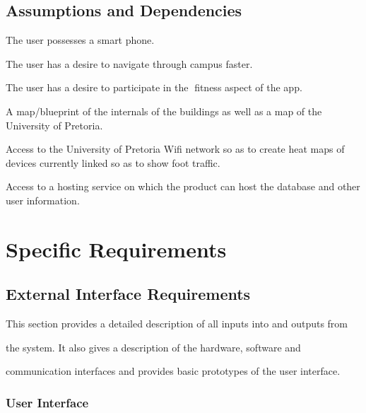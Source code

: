 \documentclass[12pt]{article}
\begin{document}
\subsection{Assumptions and Dependencies}
\begin{list}{Assumption:}{}
	\item The user possesses a smart phone.
	\item The user has a desire to navigate through campus faster.
	\item The user has a desire to participate in the fitness aspect of the
app.
\end{list}

\begin{list}{Dependency:}{}
	\item A map/blueprint of the internals of the buildings as well as a
map of the University of Pretoria.
	\item Access to the University of Pretoria Wifi network so as to create
heat maps of devices currently linked so as to show foot traffic.
	\item Access to a hosting service on which the product can host the
database and other user information.
\end{list}






\section{Specific Requirements}

\subsection{External Interface Requirements}

This section provides a detailed description of all inputs into and outputs from

the system. It also gives a description of the hardware, software and

communication interfaces and provides basic prototypes of the user interface.



\subsubsection{User Interface}
\end{document}
